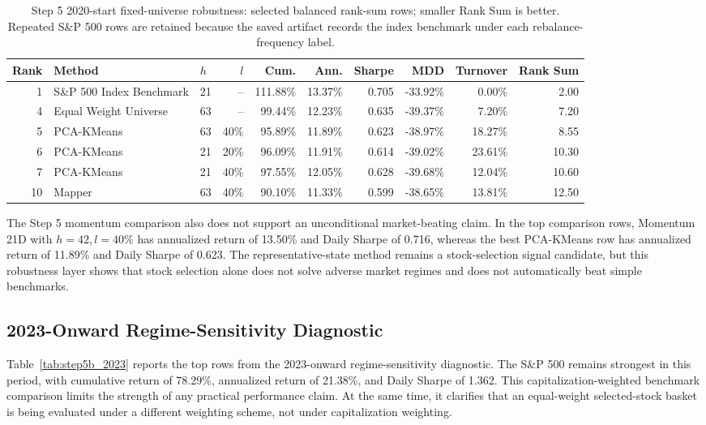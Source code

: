 \documentclass[runningheads]{llncs}
\begin{document}
\begin{table}[t]
\centering
\caption{Step 5 2020-start fixed-universe robustness: selected balanced rank-sum rows; smaller Rank Sum is better. Repeated S\&P 500 rows are retained because the saved artifact records the index benchmark under each rebalance-frequency label.}
\label{tab:step5_2020}
\scriptsize
\setlength{\tabcolsep}{2.3pt}
\begin{tabular}{rllrrrrrrr}
\toprule
Rank & Method & $h$ & $l$ & Cum. & Ann. & Sharpe & MDD & Turnover & Rank Sum \\
\midrule
1 & S\&P 500 Index Benchmark & 21 & -- & 111.88\% & 13.37\% & 0.705 & -33.92\% & 0.00\% & 2.00 \\
4 & Equal Weight Universe & 63 & -- & 99.44\% & 12.23\% & 0.635 & -39.37\% & 7.20\% & 7.20 \\
5 & PCA-KMeans & 63 & 40\% & 95.89\% & 11.89\% & 0.623 & -38.97\% & 18.27\% & 8.55 \\
6 & PCA-KMeans & 21 & 20\% & 96.09\% & 11.91\% & 0.614 & -39.02\% & 23.61\% & 10.30 \\
7 & PCA-KMeans & 21 & 40\% & 97.55\% & 12.05\% & 0.628 & -39.68\% & 12.04\% & 10.60 \\
10 & Mapper & 63 & 40\% & 90.10\% & 11.33\% & 0.599 & -38.65\% & 13.81\% & 12.50 \\
\bottomrule
\end{tabular}
\end{table}

The Step 5 momentum comparison also does not support an unconditional market-beating claim. In the top comparison rows, Momentum 21D with $h=42,l=40\%$ has annualized return of 13.50\% and Daily Sharpe of 0.716, whereas the best PCA-KMeans row has annualized return of 11.89\% and Daily Sharpe of 0.623. The representative-state method remains a stock-selection signal candidate, but this robustness layer shows that stock selection alone does not solve adverse market regimes and does not automatically beat simple benchmarks.

\subsection{2023-Onward Regime-Sensitivity Diagnostic}

Table~\ref{tab:step5b_2023} reports the top rows from the 2023-onward regime-sensitivity diagnostic. The S\&P 500 remains strongest in this period, with cumulative return of 78.29\%, annualized return of 21.38\%, and Daily Sharpe of 1.362. This capitalization-weighted benchmark comparison limits the strength of any practical performance claim. At the same time, it clarifies that an equal-weight selected-stock basket is being evaluated under a different weighting scheme, not under capitalization weighting.
\end{document}
